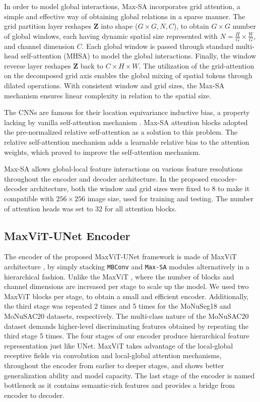 \documentclass{article}
\begin{document}
In order to model global interactions, Max-SA incorporates grid attention, a simple and effective way of obtaining global relations in a sparse manner. The grid partition layer reshapes \(\textbf{Z}\) into shape (\(G \times G, N, C\)), to obtain \(G \times G\) number of global windows, each having dynamic spatial size represented with \(N=\frac{H}{G} \times \frac{W}{G}\), and channel dimension \(C\). Each global window is passed through standard multi-head self-attention (MHSA) to model the global interactions. Finally, the window reverse layer reshapes \(\textbf{Z}\) back to \(C \times H \times W\). The utilization of the grid-attention on the decomposed grid axis enables the global mixing of spatial tokens through dilated operations. With consistent window and grid sizes, the Max-SA mechanism ensures linear complexity in relation to the spatial size.

The CNNs are famous for their location equivariance inductive bias, a property lacking by vanilla self-attention mechanism \cite{dosovitskiy2021an,han2021transformer}. Max-SA attention blocks adopted the pre-normalized relative self-attention \cite{dai2021coatnet} as a solution to this problem. The relative self-attention mechanism \cite{dai2021coatnet,shaw2018self,jiang2021transgan,cao2022swin} adds a learnable relative bias to the attention weights, which proved to improve the self-attention mechanism.

Max-SA allows global-local feature interactions on various feature resolutions throughout the encoder and decoder architecture. In the proposed encoder-decoder architecture, both the window and grid sizes were fixed to \(8\) to make it compatible with \(256 \times 256\) image size, used for training and testing. The number of attention heads was set to \(32\) for all attention blocks.

\subsection{MaxViT-UNet Encoder}\label{Encoder}

The encoder of the proposed MaxViT-UNet framework is made of MaxViT architecture \cite{tu2022maxvit}, by simply stacking \texttt{MBConv} and \texttt{Max-SA} modules alternatively in a hierarchical fashion. Unlike the MaxViT \cite{tu2022maxvit}, where the number of blocks and channel dimensions are increased per stage to scale up the model. We used two MaxViT blocks per stage, to obtain a small and efficient encoder. Additionally, the third stage was repeated 2 times and 5 times for the MoNuSeg18 and MoNuSAC20 datasets, respectively. The multi-class nature of the MoNuSAC20 dataset demands higher-level discriminating features obtained by repeating the third stage 5 times. The four stages of our encoder produce hierarchical feature representation just like UNet. MaxViT takes advantage of the local-global receptive fields via convolution and local-global attention mechanisms, throughout the encoder from earlier to deeper stages, and shows better generalization ability and model capacity. The last stage of the encoder is named bottleneck as it contains semantic-rich features and provides a bridge from encoder to decoder.
\end{document}
